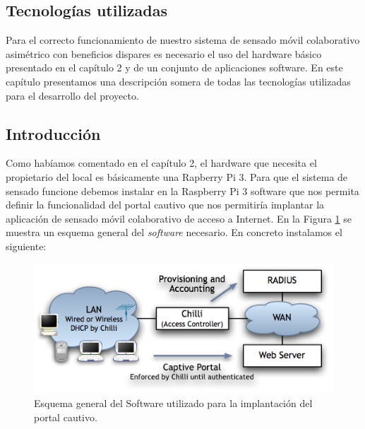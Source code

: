 \clearpage
{}%
\begin{center}
\begin{minipage}{.75\textwidth}
\section{Tecnologías utilizadas}

Para el correcto funcionamiento de nuestro sistema de sensado móvil colaborativo asimétrico con beneficios dispares es necesario el uso del hardware básico presentado en el capítulo 2 y de un conjunto de aplicaciones software. En este capítulo presentamos una descripción somera de todas las tecnologías utilizadas para el desarrollo del proyecto. %
\end{minipage}
\end{center}
\clearpage%

\subsection{Introducción}
Como habíamos comentado en el capítulo 2, el hardware que necesita el propietario del local es básicamente una Rapberry Pi 3. Para que el sistema de sensado funcione debemos instalar en la Raspberry Pi 3 software que nos permita definir la funcionalidad del portal cautivo que nos permitiría implantar la aplicación de sensado móvil colaborativo de acceso a Internet. En la Figura \ref{CoovaScheme} se muestra un esquema general del \emph{software} necesario. En concreto instalamos el siguiente:

\begin{figure}[!t]
\begin{center}
\includegraphics[width=0.75\linewidth]{./3_Tecnologias/Img/CoovaScheme.jpg}
\end{center}
\caption{Esquema general del Software utilizado para la implantación del portal cautivo.}
\label{CoovaScheme}
\end{figure}

